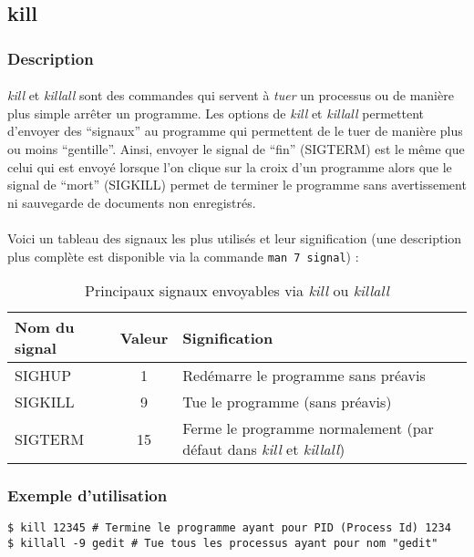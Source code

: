 \subsection*{kill}
\subsubsection*{Description}

\paragraph{}

\emph{kill} et \emph{killall} sont des commandes qui servent à \textit{tuer} un
processus ou de manière plus simple arrêter un programme. Les options de
\emph{kill} et \emph{killall} permettent d'envoyer des ``signaux'' au programme
qui permettent de le tuer de manière plus ou moins ``gentille''. Ainsi, envoyer
le signal de ``fin'' (SIGTERM) est le même que celui qui est envoyé lorsque
l'on clique sur la croix d'un programme alors que le signal de ``mort''
(SIGKILL) permet de terminer le programme sans avertissement ni sauvegarde de
documents non enregistrés.

\paragraph{}
Voici un tableau des signaux les plus utilisés et leur signification
(une description plus complète est disponible via la commande
\lstinline|man 7 signal|) :

\begin{table}[h]
	\centering
	\begin{tabular}{|l|c|l|}
		\hline
		\textbf{Nom du signal} & \textbf{Valeur} & \textbf{Signification} \\
		\hline
		SIGHUP & 1 & Redémarre le programme sans préavis \\
		\hline
		SIGKILL & 9 & Tue le programme (sans préavis) \\
		\hline
		SIGTERM & 15 & Ferme le programme normalement (par défaut dans
		\emph{kill} et \emph{killall}) \\
		\hline
	\end{tabular}
	\caption{Principaux signaux envoyables via \emph{kill} ou \emph{killall}}
	\label{tab:signal}
\end{table}

\subsubsection*{Exemple d'utilisation}

\begin{lstlisting}
$ kill 12345 # Termine le programme ayant pour PID (Process Id) 1234
$ killall -9 gedit # Tue tous les processus ayant pour nom "gedit"
\end{lstlisting}
